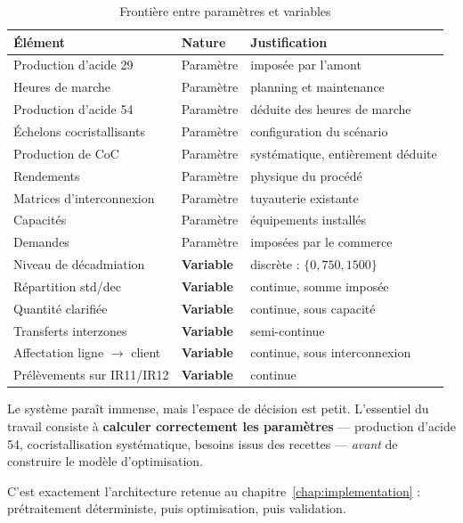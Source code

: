 \begin{table}[H]
\centering
\caption{Frontière entre paramètres et variables}
\label{tab:decide-subi}
\begin{tabular}{@{}lp{3.1cm}p{6.3cm}@{}}
\toprule
\textbf{Élément} & \textbf{Nature} & \textbf{Justification} \\
\midrule
Production d'acide 29 & Paramètre & imposée par l'amont \\
Heures de marche & Paramètre & planning et maintenance \\
Production d'acide 54 & Paramètre & déduite des heures de marche \\
Échelons cocristallisants & Paramètre & configuration du scénario \\
Production de CoC & Paramètre & systématique, entièrement déduite \\
Rendements & Paramètre & physique du procédé \\
Matrices d'interconnexion & Paramètre & tuyauterie existante \\
Capacités & Paramètre & équipements installés \\
Demandes & Paramètre & imposées par le commerce \\
\midrule
Niveau de décadmiation & \textbf{Variable} & discrète : $\{0, 750, 1500\}$ \\
Répartition std/dec & \textbf{Variable} & continue, somme imposée \\
Quantité clarifiée & \textbf{Variable} & continue, sous capacité \\
Transferts interzones & \textbf{Variable} & semi-continue \\
Affectation ligne $\to$ client & \textbf{Variable} & continue, sous interconnexion \\
Prélèvements sur IR11/IR12 & \textbf{Variable} & continue \\
\bottomrule
\end{tabular}
\end{table}

\begin{encadre}[title={La leçon de modélisation}]
Le système paraît immense, mais l'espace de décision est petit. L'essentiel du travail
consiste à \textbf{calculer correctement les paramètres} --- production d'acide 54,
cocristallisation systématique, besoins issus des recettes --- \emph{avant} de construire le
modèle d'optimisation.

C'est exactement l'architecture retenue au chapitre~\ref{chap:implementation} :
prétraitement déterministe, puis optimisation, puis validation.
\end{encadre}

